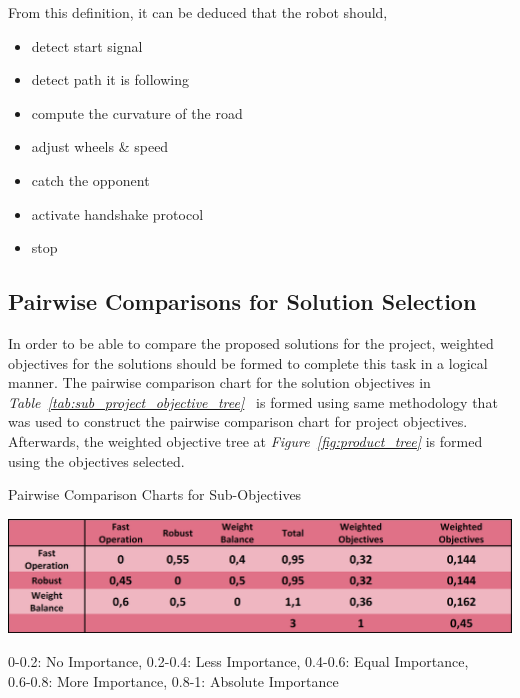 \documentclass[a4paper,12pt]{article}
\begin{document}
			From this definition, it can be deduced that the robot should,
			\begin{itemize}
				\item detect start signal\vspace{-.2cm}
				\item detect path it is following\vspace{-.2cm}
				\item compute the curvature of the road\vspace{-.2cm}
				\item adjust wheels \& speed\vspace{-.2cm}
				\item catch the opponent\vspace{-.2cm}
				\item activate handshake protocol\vspace{-.2cm}
				\item stop\vspace{-.2cm}
			\end{itemize}
	
	
	\subsection{Pairwise Comparisons for Solution Selection}	
	
		In order to be able to compare the proposed solutions for the project, weighted objectives for the solutions should be formed to complete this task in a logical manner. The pairwise comparison chart for the solution objectives in \textit{Table~\ref{tab:sub_project_objective_tree}\ } is formed using same methodology that was used to construct the pairwise comparison chart for project objectives. Afterwards, the weighted objective tree at \textit{Figure~\ref{fig:product_tree}} is formed using the objectives selected.
	
	
	\begin{table}[H]
		\centering
		\caption{\label{tab:sub_project_objective_tree}Pairwise Comparison Charts for Sub-Objectives}\vspace{-.2cm}
		\includegraphics[width=\textwidth,height=\textheight,keepaspectratio]{images/proje_objective_tree_2a} 
	\vspace*{-.9cm}	\begin{center}
		{\small 0-0.2: No Importance, 0.2-0.4: Less Importance, 0.4-0.6: Equal Importance,\\ 0.6-0.8: More Importance, 0.8-1: Absolute Importance }	
		\end{center}
	\end{table}	\vspace*{-.5cm}
	
\end{document}
